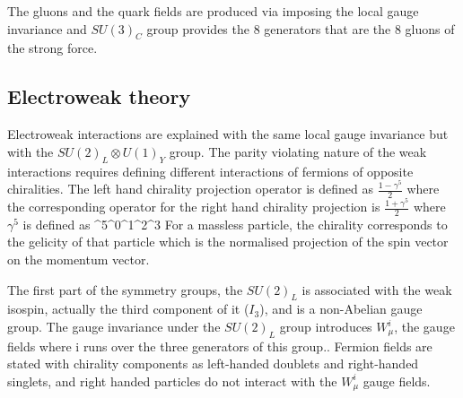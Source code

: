 The gluons and the quark fields are produced via imposing the local gauge invariance and $SU(3)_C$ group provides the 8 generators that are the 8 gluons of the strong force.

\subsection{Electroweak theory}

Electroweak interactions are explained with the same local gauge invariance but with the $SU(2)_L\otimes U(1)_Y$ group. The parity violating nature of the weak interactions requires defining different interactions of fermions of opposite chiralities. The left hand chirality projection operator is defined as $\frac{1-\gamma^5}{2}$ where the corresponding operator for the right hand chirality projection is $\frac{1+\gamma^5}{2}$ where $\gamma^5$ is defined as
\be
\gamma^5\equiv\gamma^0\gamma^1\gamma^2\gamma^3
\ee
For a massless particle, the chirality corresponds to the gelicity of that particle which is the normalised projection of the spin vector on the momentum vector.

The first part of the symmetry groups, the $SU(2)_L$ is associated with the weak isospin, actually the third component of it ($I_3$), and is a non-Abelian gauge group. The gauge invariance under the $SU(2)_L$ group introduces $W_\mu^i$, the gauge fields where i runs over the three generators of this group.. Fermion fields are stated with chirality components as left-handed doublets and right-handed singlets, and right handed particles do not interact with the $W_\mu^i$ gauge fields.

